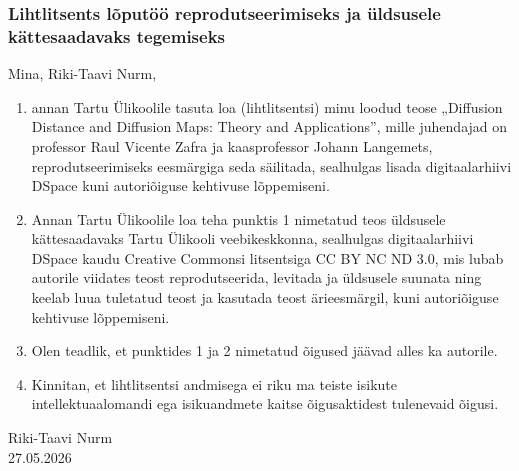 \subsubsection*{Lihtlitsents lõputöö reprodutseerimiseks ja üldsusele kättesaadavaks tegemiseks}

Mina, Riki-Taavi Nurm,

\begin{enumerate}
\item annan Tartu Ülikoolile tasuta loa (lihtlitsentsi) minu loodud teose „Diffusion Distance and Diffusion Maps: Theory and
Applications”, mille juhendajad on professor Raul Vicente Zafra ja kaasprofessor Johann Langemets, reprodutseerimiseks eesmärgiga seda säilitada, sealhulgas lisada digitaalarhiivi DSpace kuni autoriõiguse kehtivuse lõppemiseni.

\item  Annan Tartu Ülikoolile loa teha punktis 1 nimetatud teos üldsusele kättesaadavaks Tartu Ülikooli veebikeskkonna, sealhulgas digitaalarhiivi DSpace kaudu Creative Commonsi litsentsiga CC BY NC ND 3.0, mis lubab autorile viidates teost reprodutseerida, levitada ja üldsusele suunata ning keelab luua tuletatud teost ja kasutada teost ärieesmärgil, kuni autoriõiguse kehtivuse lõppemiseni.

\item  Olen teadlik, et punktides 1 ja 2 nimetatud õigused jäävad alles ka autorile.

\item Kinnitan, et lihtlitsentsi andmisega ei riku ma teiste isikute intellektuaalomandi ega isikuandmete kaitse õigusaktidest tulenevaid õigusi.
\end{enumerate}

Riki-Taavi Nurm\\
27.05.2026